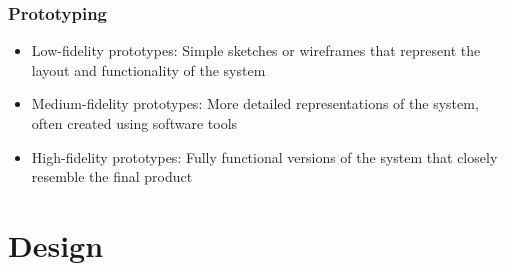 \documentclass[12pt,openany]{book}
\begin{document}
\subsubsection{Prototyping}
\begin{itemize}
    \item Low-fidelity prototypes: Simple sketches or wireframes that represent the layout and functionality of the system
    \item Medium-fidelity prototypes: More detailed representations of the system, often created using software tools
    \item High-fidelity prototypes: Fully functional versions of the system that closely resemble the final product
\end{itemize}

\section{Design}
\end{document}

